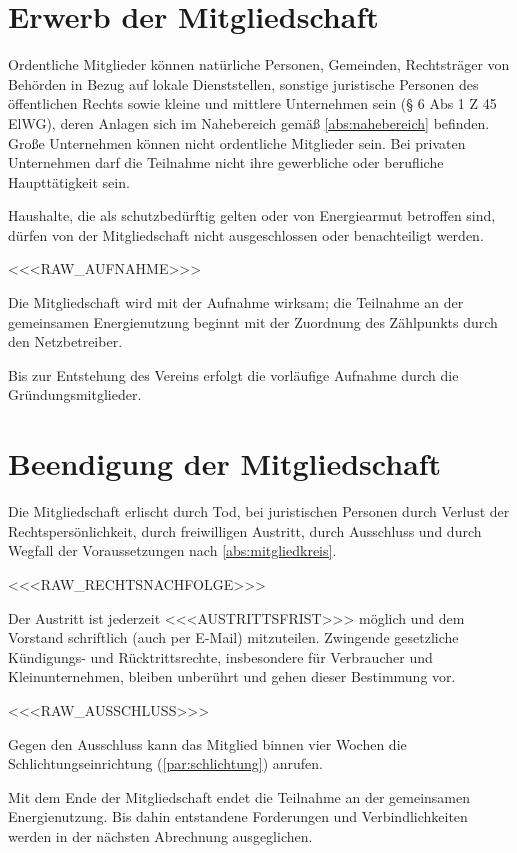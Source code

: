 \documentclass[a4paper,11pt]{article}
\begin{document}
\section{Erwerb der Mitgliedschaft}\label{par:erwerb}
\begin{absaetze}
  \item Ordentliche Mitglieder können natürliche Personen, Gemeinden, Rechtsträger von Behörden in Bezug auf lokale
        Dienststellen, sonstige juristische Personen des öffentlichen Rechts sowie kleine und mittlere Unternehmen sein
        (§ 6 Abs 1 Z 45 ElWG), deren Anlagen sich im Nahebereich gemäß \ref{abs:nahebereich} befinden. Große Unternehmen
        können nicht ordentliche Mitglieder sein. Bei privaten Unternehmen darf die Teilnahme nicht ihre gewerbliche
        oder berufliche Haupttätigkeit sein.\label{abs:mitgliedkreis}
  \item Haushalte, die als schutzbedürftig gelten oder von Energiearmut betroffen sind, dürfen von der Mitgliedschaft
        nicht ausgeschlossen oder benachteiligt werden.\label{abs:schutzbeduerftig}
  \item <<<RAW_AUFNAHME>>>
  \item Die Mitgliedschaft wird mit der Aufnahme wirksam; die Teilnahme an der gemeinsamen Energienutzung beginnt mit
        der Zuordnung des Zählpunkts durch den Netzbetreiber.
  \item Bis zur Entstehung des Vereins erfolgt die vorläufige Aufnahme durch die Gründungsmitglieder.
\end{absaetze}

\section{Beendigung der Mitgliedschaft}\label{par:ende}
\begin{absaetze}
  \item Die Mitgliedschaft erlischt durch Tod, bei juristischen Personen durch Verlust der Rechtspersönlichkeit,
        durch freiwilligen Austritt, durch Ausschluss und durch Wegfall der Voraussetzungen nach
        \ref{abs:mitgliedkreis}.
  \item <<<RAW_RECHTSNACHFOLGE>>>
  \item Der Austritt ist jederzeit <<<AUSTRITTSFRIST>>> möglich und dem Vorstand schriftlich (auch per E-Mail)
        mitzuteilen. Zwingende gesetzliche Kündigungs- und Rücktrittsrechte, insbesondere für Verbraucher und
        Kleinunternehmen, bleiben unberührt und gehen dieser Bestimmung vor.\label{abs:austritt}
  \item <<<RAW_AUSSCHLUSS>>>
  \item Gegen den Ausschluss kann das Mitglied binnen vier Wochen die Schlichtungseinrichtung (\ref{par:schlichtung})
        anrufen.
  \item Mit dem Ende der Mitgliedschaft endet die Teilnahme an der gemeinsamen Energienutzung. Bis dahin entstandene
        Forderungen und Verbindlichkeiten werden in der nächsten Abrechnung ausgeglichen.
\end{absaetze}
\end{document}
